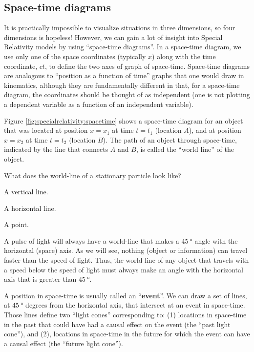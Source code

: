  
\subsection{Space-time diagrams}
It is practically impossible to visualize situations in three dimensions, so four dimensions is hopeless! However, we can gain a lot of insight into Special Relativity models by using ``space-time diagrams''. In a space-time diagram, we use only one of the space coordinates (typically $x$) along with the time coordinate, $ct$, to define the two axes of graph of space-time. Space-time diagrams are analogous to ``position as a function of time'' graphs that one would draw in kinematics, although they are fundamentally different in that, for a space-time diagram, the coordinates should be thought of as independent (one is not plotting a dependent variable as a function of an independent variable).


Figure \ref{fig:specialrelativity:spacetime} shows a space-time diagram for an object that was located at position $x=x_1$ at time $t=t_1$ (location $A$), and at position $x=x_2$ at time $t=t_2$ (location $B$). The path of an object through space-time, indicated by the line that connects $A$ and $B$, is called the ``world line'' of the object.
\begin{checkpoint}{}
	\begin{MCquestion}{What does the world-line of a stationary particle look like?}
		\item A vertical line. \correct
		\item A horizontal line.
		\item A point.
	\end{MCquestion}
\end{checkpoint}
A pulse of light will always have a world-line that makes a $\SI{45}{\degree}$ angle with the horizontal (space) axis. As we will see, nothing (object or information) can travel faster than the speed of light. Thus, the world line of any object that travels with a speed below the speed of light must always make an angle with the horizontal axis that is greater than $\SI{45}{\degree}$.

A position in space-time is usually called an ``\textbf{event}''. We can draw a set of lines, at $\SI{45}{\degree}$ degrees from the horizontal axis, that intersect at an event in space-time. Those lines define two ``light cones'' corresponding to: (1) locations in space-time in the past that could have had a causal effect on the event (the ``past light cone''), and (2), locations in space-time in the future for which the event can have a causal effect (the ``future light cone'').

